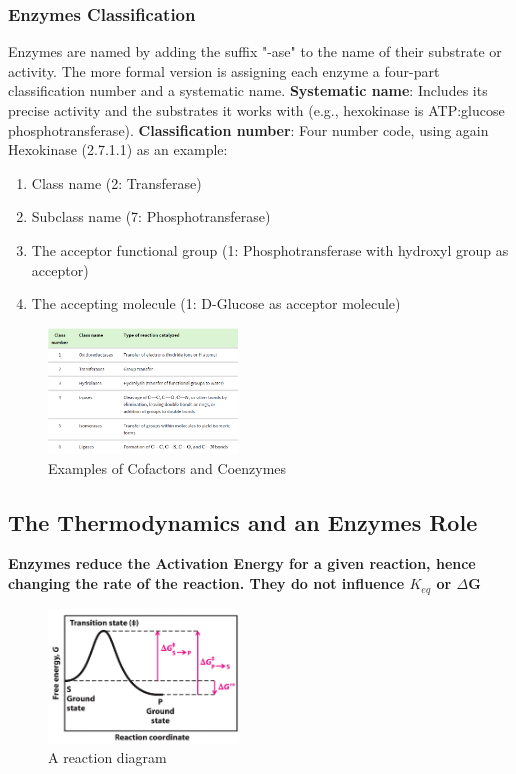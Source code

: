 \documentclass[../main.tex]{subfiles}
\begin{document}
\subsubsection{Enzymes Classification}
Enzymes are named by adding the suffix "-ase" to the name of their substrate or activity. The more formal version is assigning each enzyme a four-part classification number and a systematic name.
\textbf{\gls{Systematic name}}: Includes its precise activity and the substrates it works with (e.g., hexokinase is ATP:glucose phosphotransferase).
\textbf{\gls{Classification number}}: Four number code, using again Hexokinase (2.7.1.1) as an example:
\begin{enumerate}
	\item Class name (2: Transferase)
	\item Subclass name (7: Phosphotransferase)
	\item The acceptor functional group (1: Phosphotransferase with hydroxyl group as acceptor)
	\item The accepting molecule (1: D-Glucose as acceptor molecule)
\end{enumerate} 

\begin{figure}[h]
	\centering
	\includegraphics[width=0.45\textwidth]{Enzyme_classification}
	\caption{Examples of Cofactors and Coenzymes}
\end{figure}

\subsection{The Thermodynamics and an Enzymes Role}
\textbf{Enzymes reduce the \gls{Activation Energy} for a given reaction, hence changing the rate of the reaction. They do not influence $K_{eq}$ or $\Delta$G}

\begin{figure}[h]
	\centering
	\includegraphics[width=0.45\textwidth]{Reaction_diagram}
	\caption{A reaction diagram}
\end{figure}
\end{document}
